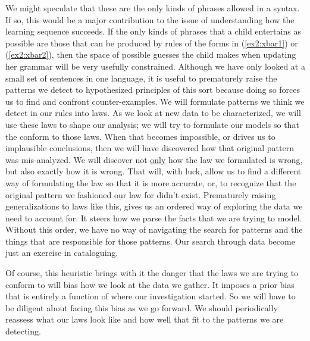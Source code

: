 We might speculate that these are the only kinds of phrases allowed in a syntax. If so, this would be a major contribution to the issue of understanding how the learning sequence succeeds. If the only kinds of phrases that a child entertains as possible are those that can be produced by rules of the forms in (\ref{ex2:xbar1}) or (\ref{ex2:xbar2}), then the space of possible guesses the child makes when updating her grammar will be very usefully constrained. Although we have only looked at a small set of sentences in one language, it is useful to prematurely raise the patterns we detect to hypothesized principles of this sort because doing so forces us to find and confront counter-examples. We will formulate patterns we think we detect in our rules into laws. As we look at new data to be characterized, we will use these laws to shape our analysis; we will try to formulate our models so that the conform to those laws. When that becomes impossible, or drives us to implausible conclusions, then we will have discovered how that original pattern was mis-analyzed. We will discover not \underline{only} how the law we formulated is wrong, but also exactly how it is wrong. That will, with luck, allow us to find a different way of formulating the law so that it is more accurate, or, to recognize that the original pattern we fashioned our law for didn't exist. Prematurely raising generalizations to laws like this, gives us an ordered way of exploring the data we need to account for. It steers how we parse the facts that we are trying to model. Without this order, we have no way of navigating the search for patterns and the things that are responsible for those patterns. Our search through data become just an exercise in cataloguing.

Of course, this heuristic brings with it the danger that the laws we are trying to conform to will bias how we look at the data we gather. It imposes a prior bias that is entirely a function of where our investigation started. So we will have to be diligent about facing this bias as we go forward. We should periodically reassess what our laws look like and how well that fit to the patterns we are detecting.


